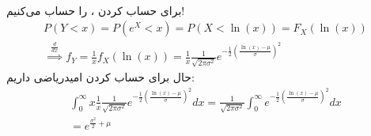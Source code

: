 \\
برای حساب کردن
، 
را حساب می‌کنیم!
\begin{gather*}
    P(Y < x) = P(e^X < x) = P(X < \ln(x)) = F_X(\ln(x))\\
    \stackrel{\frac{d}{dx}}{\implies} f_Y = \frac{1}{x} f_X(\ln(x)) = \frac{1}{x} \frac{1}{\sqrt{2 \pi \sigma^2}} e^{-\frac{1}{2}\left(\frac{\ln(x)-\mu}{\sigma}\right)^2}
\end{gather*}
حال برای حساب کردن امیدریاضی داریم:
\begin{gather*}
    \int_{0}^{\infty} x \frac{1}{x} \frac{1}{\sqrt{2 \pi \sigma^2}} e^{-\frac{1}{2}\left(\frac{\ln(x)-\mu}{\sigma}\right)^2} dx =
    \frac{1}{\sqrt{2 \pi \sigma^2}} \int_{0}^{\infty} e^{-\frac{1}{2}\left(\frac{\ln(x)-\mu}{\sigma}\right)^2} dx\\
    = e^{\frac{\sigma^2}{2} + \mu}
\end{gather*}